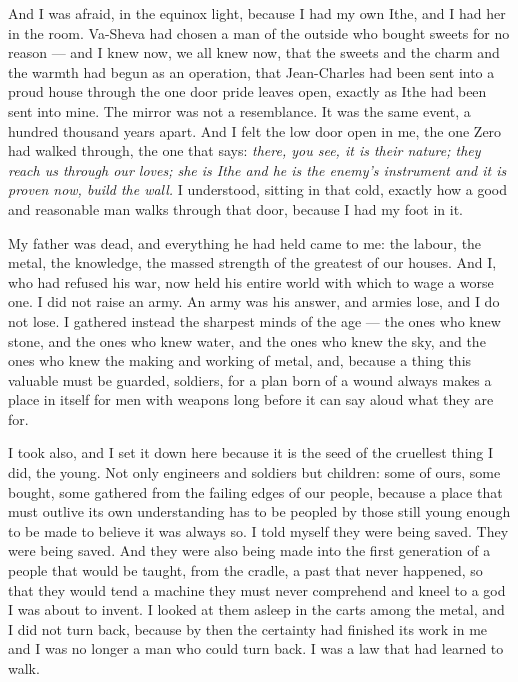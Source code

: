 And I was afraid, in the equinox light, because I had my own Ithe, and I had her in the room. Va-Sheva had chosen a man of the outside who bought sweets for no reason --- and I knew now, we all knew now, that the sweets and the charm and the warmth had begun as an operation, that Jean-Charles had been sent into a proud house through the one door pride leaves open, exactly as Ithe had been sent into mine. The mirror was not a resemblance. It was the same event, a hundred thousand years apart. And I felt the low door open in me, the one Zero had walked through, the one that says: \emph{there, you see, it is their nature; they reach us through our loves; she is Ithe and he is the enemy's instrument and it is proven now, build the wall.} I understood, sitting in that cold, exactly how a good and reasonable man walks through that door, because I had my foot in it.\par

\ornament

My father was dead, and everything he had held came to me: the labour, the metal, the knowledge, the massed strength of the greatest of our houses. And I, who had refused his war, now held his entire world with which to wage a worse one. I did not raise an army. An army was his answer, and armies lose, and I do not lose. I gathered instead the sharpest minds of the age --- the ones who knew stone, and the ones who knew water, and the ones who knew the sky, and the ones who knew the making and working of metal, and, because a thing this valuable must be guarded, soldiers, for a plan born of a wound always makes a place in itself for men with weapons long before it can say aloud what they are for.\par

I took also, and I set it down here because it is the seed of the cruellest thing I did, the young. Not only engineers and soldiers but children: some of ours, some bought, some gathered from the failing edges of our people, because a place that must outlive its own understanding has to be peopled by those still young enough to be made to believe it was always so. I told myself they were being saved. They were being saved. And they were also being made into the first generation of a people that would be taught, from the cradle, a past that never happened, so that they would tend a machine they must never comprehend and kneel to a god I was about to invent. I looked at them asleep in the carts among the metal, and I did not turn back, because by then the certainty had finished its work in me and I was no longer a man who could turn back. I was a law that had learned to walk.\par

